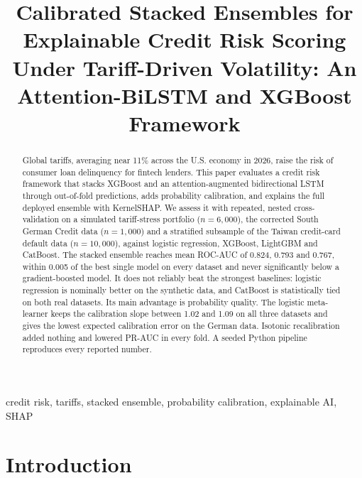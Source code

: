 \documentclass[conference,a4paper]{IEEEtran}
\begin{document}
\title{Calibrated Stacked Ensembles for Explainable Credit Risk Scoring Under Tariff-Driven Volatility: An Attention-BiLSTM and XGBoost Framework}
\author{
\and
{}
}
\maketitle
\begin{abstract}
Global tariffs, averaging near 11\% across the U.S. economy in 2026, raise the risk of consumer loan delinquency for fintech lenders. This paper evaluates a credit risk framework that stacks XGBoost and an attention-augmented bidirectional LSTM through out-of-fold predictions, adds probability calibration, and explains the full deployed ensemble with KernelSHAP. We assess it with repeated, nested cross-validation on a simulated tariff-stress portfolio ($n=6{,}000$), the corrected South German Credit data ($n=1{,}000$) and a stratified subsample of the Taiwan credit-card default data ($n=10{,}000$), against logistic regression, XGBoost, LightGBM and CatBoost. The stacked ensemble reaches mean ROC-AUC of 0.824, 0.793 and 0.767, within 0.005 of the best single model on every dataset and never significantly below a gradient-boosted model. It does not reliably beat the strongest baselines: logistic regression is nominally better on the synthetic data, and CatBoost is statistically tied on both real datasets. Its main advantage is probability quality. The logistic meta-learner keeps the calibration slope between 1.02 and 1.09 on all three datasets and gives the lowest expected calibration error on the German data. Isotonic recalibration added nothing and lowered PR-AUC in every fold. A seeded Python pipeline reproduces every reported number.
\end{abstract}
\begin{IEEEkeywords}
credit risk, tariffs, stacked ensemble, probability calibration, explainable AI, SHAP
\end{IEEEkeywords}

\section{Introduction}
\end{document}
